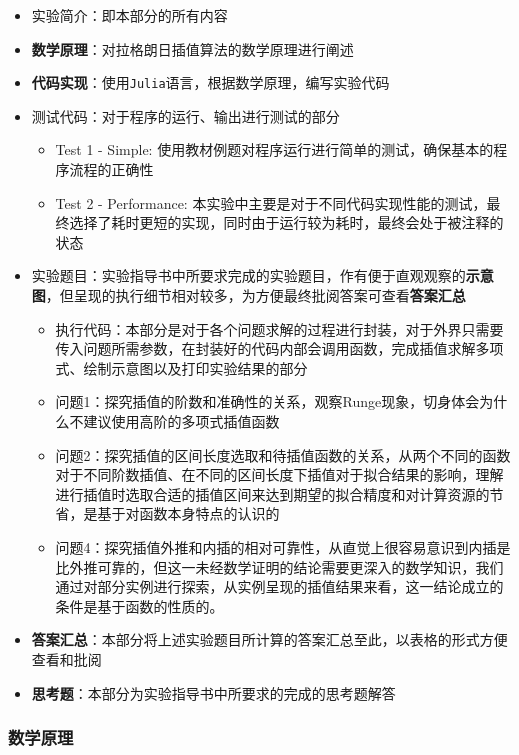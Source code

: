 \documentclass[11pt]{article}
\providecommand{\tightlist}{%
      \setlength{\itemsep}{0pt}\setlength{\parskip}{0pt}}
\begin{document}
\begin{itemize}
\tightlist
\item
  实验简介：即本部分的所有内容
\item
  \textbf{数学原理}：对拉格朗日插值算法的数学原理进行阐述
\item
  \textbf{代码实现}：使用\texttt{Julia}语言，根据数学原理，编写实验代码
\item
  测试代码：对于程序的运行、输出进行测试的部分

  \begin{itemize}
  \tightlist
  \item
    Test 1 - Simple:
    使用教材例题对程序运行进行简单的测试，确保基本的程序流程的正确性
  \item
    Test 2 - Performance:
    本实验中主要是对于不同代码实现性能的测试，最终选择了耗时更短的实现，同时由于运行较为耗时，最终会处于被注释的状态
  \end{itemize}
\item
  实验题目：实验指导书中所要求完成的实验题目，作有便于直观观察的\textbf{示意图}，但呈现的执行细节相对较多，为方便最终批阅答案可查看\textbf{答案汇总}

  \begin{itemize}
  \tightlist
  \item
    执行代码：本部分是对于各个问题求解的过程进行封装，对于外界只需要传入问题所需参数，在封装好的代码内部会调用函数，完成插值求解多项式、绘制示意图以及打印实验结果的部分
  \item
    问题1：探究插值的阶数和准确性的关系，观察Runge现象，切身体会为什么不建议使用高阶的多项式插值函数
  \item
    问题2：探究插值的区间长度选取和待插值函数的关系，从两个不同的函数对于不同阶数插值、在不同的区间长度下插值对于拟合结果的影响，理解进行插值时选取合适的插值区间来达到期望的拟合精度和对计算资源的节省，是基于对函数本身特点的认识的
  \item
    问题4：探究插值外推和内插的相对可靠性，从直觉上很容易意识到内插是比外推可靠的，但这一未经数学证明的结论需要更深入的数学知识，我们通过对部分实例进行探索，从实例呈现的插值结果来看，这一结论成立的条件是基于函数的性质的。
  \end{itemize}
\item
  \textbf{答案汇总}：本部分将上述实验题目所计算的答案汇总至此，以表格的形式方便查看和批阅
\item
  \textbf{思考题}：本部分为实验指导书中所要求的完成的思考题解答
\end{itemize}

    \hypertarget{ux6570ux5b66ux539fux7406}{%
\subsubsection{数学原理}\label{ux6570ux5b66ux539fux7406}}
\end{document}
